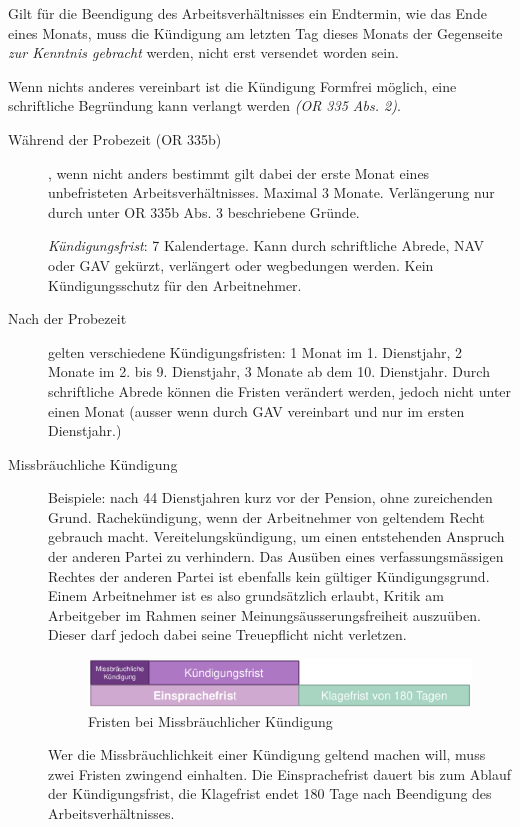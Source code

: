 Gilt für die Beendigung des Arbeitsverhältnisses ein Endtermin, wie das Ende eines Monats, muss die Kündigung am letzten Tag dieses Monats der Gegenseite \textit{zur Kenntnis gebracht} werden, nicht erst versendet worden sein.

Wenn nichts anderes vereinbart ist die Kündigung Formfrei möglich, eine schriftliche Begründung kann verlangt werden \textit{(OR 335 Abs. 2)}.

\begin{description}
  \item[Während der Probezeit (OR 335b)], wenn nicht anders bestimmt gilt dabei der erste Monat eines unbefristeten Arbeitsverhältnisses. Maximal 3 Monate. Verlängerung nur durch unter OR 335b Abs. 3 beschriebene Gründe.
  
  \textit{Kündigungsfrist}: 7 Kalendertage. Kann durch schriftliche Abrede, NAV oder GAV gekürzt, verlängert oder wegbedungen werden. Kein Kündigungsschutz für den Arbeitnehmer.
  
  \item[Nach der Probezeit] gelten verschiedene Kündigungsfristen: 1 Monat im 1. Dienstjahr, 2 Monate im 2. bis 9. Dienstjahr, 3 Monate ab dem 10. Dienstjahr. Durch schriftliche Abrede können die Fristen verändert werden, jedoch nicht unter einen Monat (ausser wenn durch GAV vereinbart und nur im ersten Dienstjahr.) 
  
  \item[Missbräuchliche Kündigung]
  Beispiele: nach 44 Dienstjahren kurz vor der Pension, ohne zureichenden Grund. Rachekündigung, wenn der Arbeitnehmer von geltendem Recht gebrauch macht. Vereitelungskündigung, um einen entstehenden Anspruch der anderen Partei zu verhindern. Das Ausüben eines verfassungsmässigen Rechtes der anderen Partei ist ebenfalls kein gültiger Kündigungsgrund. Einem Arbeitnehmer ist es also grundsätzlich erlaubt, Kritik am Arbeitgeber im Rahmen seiner Meinungsäusserungsfreiheit auszuüben. Dieser darf jedoch dabei seine Treuepflicht nicht verletzen. 
  \begin{figure}[H]
    \centering
    \includegraphics[width=12cm]{res/arbeitsrecht-missbr-kuendigung-fristen.png}
    \caption{Fristen bei Missbräuchlicher Kündigung}
  \end{figure}

  Wer die Missbräuchlichkeit einer Kündigung geltend machen will, muss zwei Fristen zwingend einhalten. Die Einsprachefrist dauert bis zum Ablauf der Kündigungsfrist, die Klagefrist endet 180 Tage nach Beendigung des Arbeitsverhältnisses.


\end{description}
